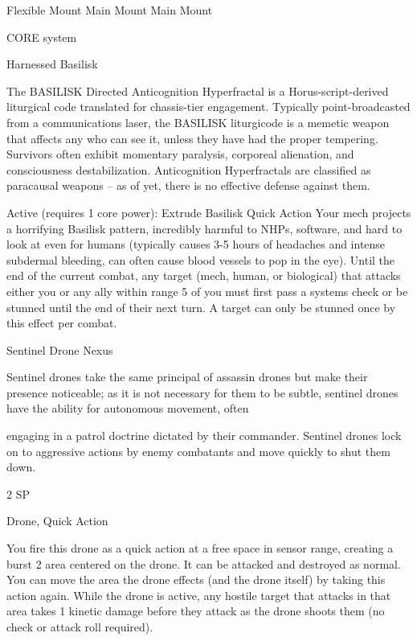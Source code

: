  Flexible Mount                    Main Mount                             Main Mount 

                                                CORE system 

                                             Harnessed Basilisk   

 The BASILISK Directed Anticognition Hyperfractal is a Horus-script-derived liturgical code translated for  
 chassis-tier engagement. Typically point-broadcasted from a communications laser, the BASILISK  
 liturgicode is a memetic weapon that affects any who can see it, unless they have had the proper  
 tempering. Survivors often exhibit momentary paralysis, corporeal alienation, and consciousness  
 destabilization. Anticognition Hyperfractals are classified as paracausal weapons -- as of yet, there is no  
 effective defense against them.     

 Active (requires 1 core power):  
 Extrude Basilisk  
 Quick Action  
 Your mech projects a horrifying Basilisk pattern, incredibly harmful to NHPs, software, and hard to look  
 at even for humans (typically causes 3-5 hours of headaches and intense subdermal bleeding, can  
 often cause blood vessels to pop in the eye). Until the end of the current combat, any target (mech,  
 human, or biological) that attacks either you or any ally within range 5 of you must first pass a systems  
 check or be stunned until the end of their next turn. A target can only be stunned once by this effect per  
 combat. 

Sentinel Drone Nexus  

Sentinel drones take the same principal of assassin drones but make their presence noticeable; as it is not  
necessary for them to be subtle, sentinel drones have the ability for autonomous movement, often  

                                                                                                             


engaging in a patrol doctrine dictated by their commander. Sentinel drones lock on to aggressive actions  
by enemy combatants and move quickly to shut them down.  

2 SP
 
Drone, Quick Action
 
You fire this drone as a quick action at a free space in sensor range, creating a burst 2 area  
centered on the drone. It can be attacked and destroyed as normal. You can move the area the  
drone effects (and the drone itself) by taking this action again. While the drone is active, any  
hostile target that attacks in that area takes 1 kinetic damage before they attack as the drone  
shoots them (no check or attack roll required).
 

